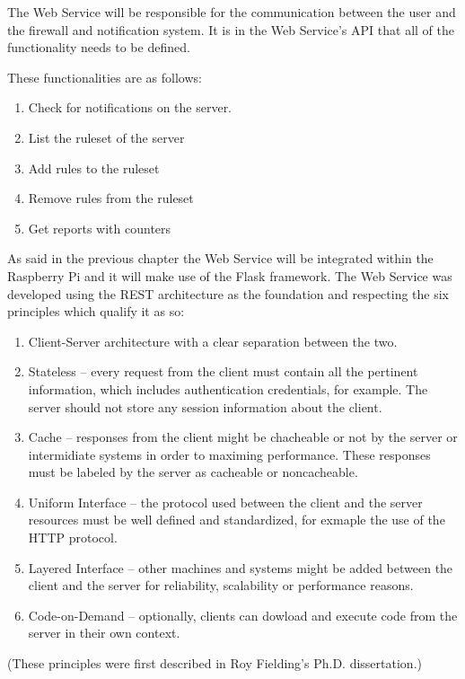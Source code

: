 The Web Service will be responsible for the communication between the user and
the firewall and notification system. It is in the Web Service's API that all of
the functionality needs to be defined.

These functionalities are as follows:
\begin{enumerate}
	\item Check for notifications on the server.
	\item List the ruleset of the server
	\item Add rules to the ruleset
	\item Remove rules from the ruleset
	\item Get reports with counters
\end{enumerate}

As said in the previous chapter the Web Service will be integrated within the
Raspberry Pi and it will make use of the Flask framework. The Web Service was
developed using the REST architecture as the foundation and respecting the six
principles which qualify it as so:
\begin{enumerate}
	\item Client-Server architecture with a clear separation between the two.
	\item Stateless -- every request from the client must contain all the
		pertinent information, which includes authentication credentials, for
		example. The server should not store any session information about the
		client.
	\item Cache -- responses from the client might be chacheable or not by the
		server or intermidiate systems in order to maximing performance. These
		responses must be labeled by the server as cacheable or noncacheable.
	\item Uniform Interface -- the protocol used between the client and the
		server resources must be well defined and standardized, for exmaple the
		use of the HTTP protocol.
	\item Layered Interface -- other machines and systems might be added between
		the client and the server for reliability, scalability or performance
		reasons.
	\item Code-on-Demand -- optionally, clients can dowload and execute code
		from the server in their own context.
\end{enumerate}
(These principles were first described in Roy Fielding's Ph.D. dissertation.)

